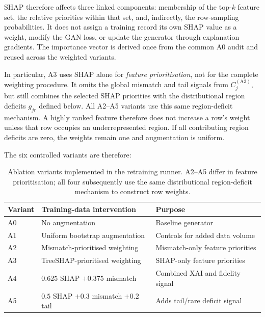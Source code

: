 SHAP therefore affects three linked components: membership of the top-$k$
feature set, the relative priorities within that set, and, indirectly, the
row-sampling probabilities. It does not assign a training record its own SHAP
value as a weight, modify the GAN loss, or update the generator through
explanation gradients. The importance vector is derived once from the common
A0 audit and reused across the weighted variants.

In particular, A3 uses SHAP alone for \emph{feature prioritisation}, not for
the complete weighting procedure. It omits the global mismatch and tail
signals from $C_j^{(\mathrm{A3})}$, but still combines the selected SHAP
priorities with the distributional region deficits $g_{jr}$ defined below.
All A2--A5 variants use this same region-deficit mechanism. A highly ranked
feature therefore does not increase a row's weight unless that row occupies
an underrepresented region. If all contributing region deficits are zero,
the weights remain one and augmentation is uniform.

The six controlled variants are therefore:

\begin{table}[htbp]
    \centering
    \caption{Ablation variants implemented in the retraining runner.
    A2--A5 differ in feature prioritisation; all four subsequently use the
    same distributional region-deficit mechanism to construct row weights.}
    \label{tab:ablation_variants}
    \begingroup
    \small
    \setlength{\tabcolsep}{4pt}
    \begin{tabular}{p{13mm}p{48mm}p{68mm}}
        \hline
        Variant & Training-data intervention & Purpose \\
        \hline
        A0 & No augmentation & Baseline generator \\
        A1 & Uniform bootstrap augmentation & Controls for added data volume \\
        A2 & Mismatch-prioritised weighting & Mismatch-only feature priorities \\
        A3 & TreeSHAP-prioritised weighting & SHAP-only feature priorities \\
        A4 & $0.625$ SHAP $+0.375$ mismatch & Combined XAI and fidelity signal \\
        A5 & $0.5$ SHAP $+0.3$ mismatch $+0.2$ tail & Adds tail/rare deficit signal \\
        \hline
    \end{tabular}
    \endgroup
\end{table}

